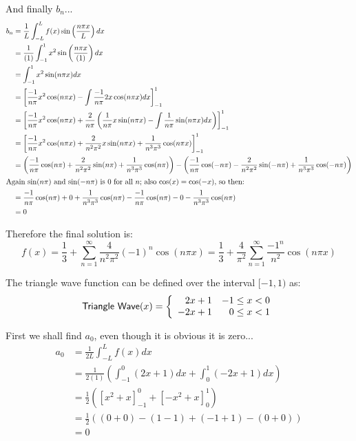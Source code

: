 \documentclass[letterpaper,8pt]{article}
\begin{document}
And finally $b_n$...
\begin{align*}
b_n &= \frac{1}{L} \int_{-L}^L f(x) \sin \left( \frac{n\pi x}{L} \right) dx \\
    &= \frac{1}{(1)} \int_{-1}^1 x^2 \sin \left( \frac{n\pi x}{(1)} \right) dx \\
    &= \int_{-1}^1 x^2 \sin ( n\pi x ) dx \\
    &= \left[ \frac{-1}{n\pi} x^2 \cos (n\pi x) - \int \frac{-1}{n\pi} 2x \cos (n\pi x) dx \right]_{-1}^1 \\
    &= \left[ \frac{-1}{n\pi} x^2 \cos (n\pi x) + \frac{2}{n\pi} \left( \frac{1}{n\pi} x \sin (n\pi x) - \int \frac{1}{n\pi} \sin (n\pi x) dx \right) \right]_{-1}^1 \\
    &= \left[ \frac{-1}{n\pi} x^2 \cos (n\pi x) + \frac{2}{n^2\pi^2} x \sin (n\pi x) + \frac{1}{n^3\pi^3} \cos (n\pi x) \right]_{-1}^1 \\
    &= \left( \frac{-1}{n\pi} \cos (n\pi) + \frac{2}{n^2\pi^2} \sin (n\pi) + \frac{1}{n^3\pi^3} \cos (n\pi) \right) - 
       \left( \frac{-1}{n\pi} \cos (-n\pi) - \frac{2}{n^2\pi^2} \sin (-n\pi) + \frac{1}{n^3\pi^3} \cos (-n\pi) \right)  \\
\intertext{Again $\sin (n\pi)$ and $\sin (-n\pi)$ is 0 for all $n$; also $\cos (x) = \cos(-x)$, so then:}
    &= \frac{-1}{n\pi} \cos (n\pi) + 0 + \frac{1}{n^3\pi^3} \cos (n\pi) - \frac{-1}{n\pi} \cos (n\pi) - 0 - \frac{1}{n^3\pi^3} \cos (n\pi) \\
    &= 0
\end{align*}

Therefore the final solution is:
\[
f(x) = \frac{1}{3} + \sum_{n = 1}^\infty \frac{4}{n^2\pi^2} (-1)^n \cos (n \pi x) 
     = \frac{1}{3} + \frac{4}{\pi^2} \sum_{n = 1}^\infty \frac{-1^n}{n^2} \cos (n \pi x) 
\]



The triangle wave function can be defined over the interval $[-1, 1)$ as:
\[
\mathsf{Triangle\ Wave}(x) = \left\{ \begin{array}{ll} 
                                          \hphantom{-}2x + 1 & -1 \leq x < 0 \\
                                          -2x + 1 &  \hphantom{-}0 \leq x < 1
                                       \end{array} \right.
\]

First we shall find $a_0$, even though it is obvious it is zero...
\begin{align*}
a_0 &= \frac{1}{2L} \int_{-L}^L f(x) dx  \\
    &= \frac{1}{2(1)} \left( \int_{-1}^0 (2x + 1) dx + \int_0^1 (-2x + 1) dx \right) \\
    &= \frac{1}{2} \left( \left[ x^2 + x \right]^0_{-1} + \left[ -x^2 + x \right]_0^1 \right) \\
    &= \frac{1}{2} \left( (0 + 0) - (1 - 1) + (-1 + 1) - (0 + 0) \right) \\
    &= 0
\end{align*}
\end{document}
